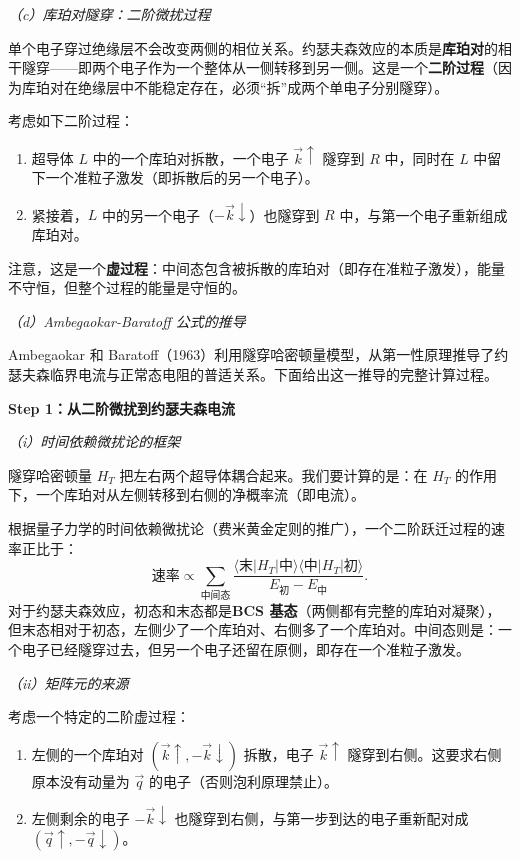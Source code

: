 \textit{（c）库珀对隧穿：二阶微扰过程}

单个电子穿过绝缘层不会改变两侧的相位关系。约瑟夫森效应的本质是\textbf{库珀对}的相干隧穿——即两个电子作为一个整体从一侧转移到另一侧。这是一个\textbf{二阶过程}（因为库珀对在绝缘层中不能稳定存在，必须``拆''成两个单电子分别隧穿）。

考虑如下二阶过程：
\begin{enumerate}[nosep]
    \item 超导体 $L$ 中的一个库珀对拆散，一个电子 $\vec{k}\uparrow$ 隧穿到 $R$ 中，同时在 $L$ 中留下一个准粒子激发（即拆散后的另一个电子）。
    \item 紧接着，$L$ 中的另一个电子（$-\vec{k}\downarrow$）也隧穿到 $R$ 中，与第一个电子重新组成库珀对。
\end{enumerate}

注意，这是一个\textbf{虚过程}：中间态包含被拆散的库珀对（即存在准粒子激发），能量不守恒，但整个过程的能量是守恒的。

\textit{（d）Ambegaokar-Baratoff 公式的推导}

Ambegaokar 和 Baratoff（1963）利用隧穿哈密顿量模型，从第一性原理推导了约瑟夫森临界电流与正常态电阻的普适关系。下面给出这一推导的完整计算过程。

\textbf{Step 1：从二阶微扰到约瑟夫森电流}

\textit{（i）时间依赖微扰论的框架}

隧穿哈密顿量 $H_T$ 把左右两个超导体耦合起来。我们要计算的是：在 $H_T$ 的作用下，一个库珀对从左侧转移到右侧的净概率流（即电流）。

根据量子力学的时间依赖微扰论（费米黄金定则的推广），一个二阶跃迁过程的速率正比于：
\[
\text{速率} \propto \sum_{\text{中间态}} \frac{\langle \text{末}|H_T|\text{中}\rangle \langle \text{中}|H_T|\text{初}\rangle}{E_{\text{初}} - E_{\text{中}}}.
\]
对于约瑟夫森效应，初态和末态都是\textbf{BCS 基态}（两侧都有完整的库珀对凝聚），但末态相对于初态，左侧少了一个库珀对、右侧多了一个库珀对。中间态则是：一个电子已经隧穿过去，但另一个电子还留在原侧，即存在一个准粒子激发。

\textit{（ii）矩阵元的来源}

考虑一个特定的二阶虚过程：
\begin{enumerate}[nosep]
    \item 左侧的一个库珀对 $(\vec{k}\uparrow, -\vec{k}\downarrow)$ 拆散，电子 $\vec{k}\uparrow$ 隧穿到右侧。这要求右侧原本没有动量为 $\vec{q}$ 的电子（否则泡利原理禁止）。
    \item 左侧剩余的电子 $-\vec{k}\downarrow$ 也隧穿到右侧，与第一步到达的电子重新配对成 $(\vec{q}\uparrow, -\vec{q}\downarrow)$。
\end{enumerate}

